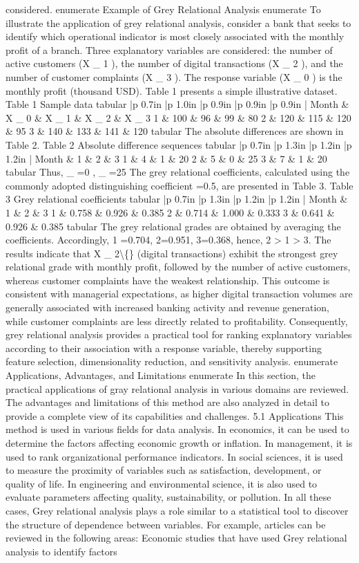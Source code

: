 \documentclass[10pt,twoside]{article}
\begin{document}
\begin{minipage}[t][\textheight]{\textwidth}
considered. enumerate Example of Grey Relational Analysis enumerate To illustrate the application of grey relational analysis, consider a bank that seeks to identify which operational indicator is most closely associated with the monthly profit of a branch. Three explanatory variables are considered: the number of active customers (X \_ 1 ), the number of digital transactions (X \_ 2 ), and the number of customer complaints (X \_ 3 ). The response variable (X \_ 0 ) is the monthly profit (thousand USD). Table 1 presents a simple illustrative dataset. Table 1 Sample data tabular |p 0.7in |p 1.0in |p 0.9in |p 0.9in |p 0.9in | Month \& X \_ 0 \& X \_ 1 \& X \_ 2 \& X \_ 3 1 \& 100 \& 96 \& 99 \& 80 2 \& 120 \& 115 \& 120 \& 95 3 \& 140 \& 133 \& 141 \& 120 tabular The absolute differences are shown in Table 2. Table 2 Absolute difference sequences tabular |p 0.7in |p 1.3in |p 1.2in |p 1.2in | Month \& 1 \& 2 \& 3 1 \& 4 \& 1 \& 20 2 \& 5 \& 0 \& 25 3 \& 7 \& 1 \& 20 tabular Thus, \_ =0 , \_ =25 The grey relational coefficients, calculated using the commonly adopted distinguishing coefficient =0.5, are presented in Table 3. Table 3 Grey relational coefficients tabular |p 0.7in |p 1.3in |p 1.2in |p 1.2in | Month \& 1 \& 2 \& 3 1 \& 0.758 \& 0.926 \& 0.385 2 \& 0.714 \& 1.000 \& 0.333 3 \& 0.641 \& 0.926 \& 0.385 tabular The grey relational grades are obtained by averaging the coefficients. Accordingly, 1 =0.704, 2=0.951, 3=0.368, hence, 2 > 1 > 3. The results indicate that X \_ 2\textbackslash\{\} (digital transactions) exhibit the strongest grey relational grade with monthly profit, followed by the number of active customers, whereas customer complaints have the weakest relationship. This outcome is consistent with managerial expectations, as higher digital transaction volumes are generally associated with increased banking activity and revenue generation, while customer complaints are less directly related to profitability. Consequently, grey relational analysis provides a practical tool for ranking explanatory variables according to their association with a response variable, thereby supporting feature selection, dimensionality reduction, and sensitivity analysis. enumerate Applications, Advantages, and Limitations enumerate In this section, the practical applications of gray relational analysis in various domains are reviewed. The advantages and limitations of this method are also analyzed in detail to provide a complete view of its capabilities and challenges. 5.1 Applications This method is used in various fields for data analysis. In economics, it can be used to determine the factors affecting economic growth or inflation. In management, it is used to rank organizational performance indicators. In social sciences, it is used to measure the proximity of variables such as satisfaction, development, or quality of life. In engineering and environmental science, it is also used to evaluate parameters affecting quality, sustainability, or pollution. In all these cases, Grey relational analysis plays a role similar to a statistical tool to discover the structure of dependence between variables. For example, articles can be reviewed in the following areas: Economic studies that have used Grey relational analysis to identify factors 
\end{minipage}
\end{document}
